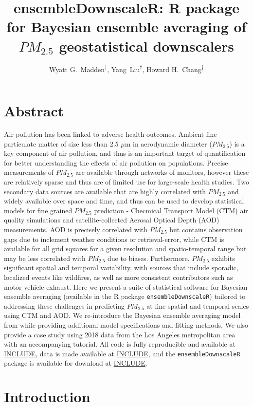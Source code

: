 \documentclass[12pt]{article}
\title{ensembleDownscaleR: R package for Bayesian ensemble averaging of $PM_{2.5}$ geostatistical downscalers}
\author{Wyatt G.\relax ~Madden\textsuperscript{$\dagger$}, Yang\relax ~Liu\textsuperscript{$\ddagger$}, Howard H.\relax ~Chang\textsuperscript{$\dagger$}}
\date{}
\begin{document}
\maketitle

\section*{Abstract}

Air pollution has been linked to adverse health outcomes. 
Ambient fine particulate matter of size less than 2.5 $\mu$m in aerodynamic diameter ($PM_{2.5}$) is a key component of air pollution, and thus is an important target of quantification for better understanding the effects of air pollution on populations. 
Precise measurements of $PM_{2.5}$ are available through networks of monitors, however these are relatively sparse and thus are of limited use for large-scale health studies. 
Two secondary data sources are available that are highly correlated with $PM_{2.5}$ and widely available over space and time, and thus can be used to develop statistical models for fine grained $PM_{2.5}$ prediction - Checmical Transport Model (CTM) air quality simulations and satellite-collected Aerosal Optical Depth (AOD) measurements. 
AOD is precisely correlated with $PM_{2.5}$ but contains observation gaps due to inclement weather conditions or retrieval-error, while CTM is available for all grid squares for a given resolution and spatio-temporal range but may be less correlated with $PM_{2.5}$ due to biases. 
Furthermore, $PM_{2.5}$ exhibits significant spatial and temporal variability, with sources that include sporadic, localized events like wildfires, as well as more consistent contributors such as motor vehicle exhaust.
Here we present a suite of statistical software for Bayesian ensemble averaging (available in the R package \texttt{ensembleDownscaleR}) tailored to addressing these challenges in predicting $PM_{2.5}$ at fine spatial and temporal scales using CTM and AOD. 
We re-introduce the Bayesian ensemble averaging model from \cite{murray2019} while providing additional model specifications and fitting methods.
We also provide a case study using 2018 data from the Los Angeles metropolitan area with an accompanying tutorial. 
All code is fully reproducible and available at \url{INCLUDE}, data is made available at \url{INCLUDE}, and the \texttt{ensembleDownscaleR} package is available for download at \url{INCLUDE}.



\section*{Introduction}
\end{document}
